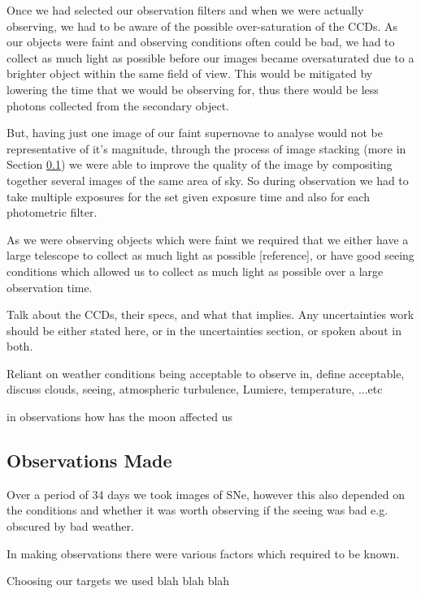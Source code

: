 \documentclass[twocolumn]{revtex4}
\begin{document}
Once we had selected our observation filters and when we were actually observing, we had to be aware of the possible over-saturation of the CCDs. As our objects were faint and observing conditions often could be bad, we had to collect as much light as possible before our images became oversaturated due to a brighter object within the same field of view. This would be mitigated by lowering the time that we would be observing for, thus there would be less photons collected from the secondary object.

But, having just one image of our faint supernovae to analyse would not be representative of it's magnitude, through the process of image stacking (more in Section \ref{observer-observations}) we were able to improve the quality of the image by compositing together several images of the same area of sky. So during observation we had to take multiple exposures for the set given exposure time and also for each photometric filter. 

As we were observing objects which were faint we required that we either have a large telescope to collect as much light as possible [reference], or have good seeing conditions which allowed us to collect as much light as possible over a large observation time.

Talk about the CCDs, their specs, and what that implies. Any uncertainties work should be either stated here, or in the uncertainties section, or spoken about in both. 

Reliant on weather conditions being acceptable to observe in, define acceptable, discuss clouds, seeing, atmospheric turbulence, Lumiere, temperature, ...etc

in observations how has the moon affected us


\vspace{-3ex}
\subsection{Observations Made}
\label{observer-observations}
\vspace{-2ex}

Over a period of 34 days we took images of SNe, however this also depended on the conditions and whether it was worth observing if the seeing was bad e.g. obscured by bad weather.

In making observations there were various factors which required to be known.

Choosing our targets we used blah blah blah
\end{document}
